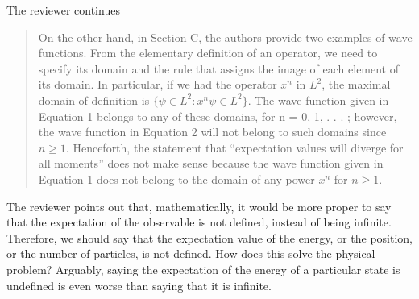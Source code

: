\documentclass[11pt, executivepaper]{article}
\begin{document}
The reviewer continues
\begin{quote}
	On the other hand, in Section C, the authors provide two examples of wave
	functions. From the elementary definition of an operator, we need to specify its
	domain and the rule that assigns the image of each element of its domain. In
	particular, if we had the operator $x^n$ in $L^2$, the maximal domain of definition
	is $\{\psi \in L^2 : x^n \psi \in L^2\}$. The wave function given in Equation 1 belongs to any
	of these domains, for n = 0, 1, . . . ; however, the wave function in Equation 2
	will not belong to such domains since $n \geq 1$. Henceforth, the statement that
	``expectation values will diverge for all moments'' does not make sense because
	the wave function given in Equation 1 does not belong to the domain of any
	power $x^n$ for $n \geq 1$.
\end{quote}
The reviewer points out that, mathematically, it would be more proper to say that the expectation of the observable is not defined, instead of being infinite. Therefore, we should say that the expectation value of the energy, or the position, or the number of particles, is not defined. How does this solve the physical problem? Arguably, saying the expectation of the energy of a particular state is undefined is even worse than saying that it is infinite. 
\end{document}
